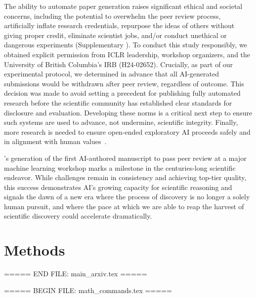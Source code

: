The ability to automate paper generation raises significant ethical and societal concerns, including the potential to overwhelm the peer review process, artificially inflate research credentials, repurpose the ideas of others without giving proper credit, eliminate scientist jobs, and/or conduct unethical or dangerous experiments (Supplementary ).
To conduct this study responsibly, we obtained explicit permission from ICLR leadership, workshop organizers, and the University of British Columbia's IRB (H24-02652).
Crucially, as part of our experimental protocol, we determined in advance that all AI-generated submissions would be withdrawn after peer review, regardless of outcome.
This decision was made to avoid setting a precedent for publishing fully automated research before the scientific community has established clear standards for disclosure and evaluation.
Developing these norms is a critical next step to ensure such systems are used to advance, not undermine, scientific integrity.
Finally, more research is needed to ensure open-ended exploratory AI proceeds safely and in alignment with human values~\citep{bommasani2021opportunities, ecoffet2020open}.

\ouralgo's generation of the first AI-authored manuscript to pass peer review at a major machine learning workshop marks a milestone in the centuries-long scientific endeavor.
While challenges remain in consistency and achieving top-tier quality, this success demonstrates AI's growing capacity for scientific reasoning and signals the dawn of a new era where the process of discovery is no longer a solely human pursuit, and where the pace at which we are able to reap the harvest of scientific discovery could accelerate dramatically.

\clearpage
\section*{Methods}
\label{sec:methods}



\clearpage
\hypersetup{pageanchor=false}

\hypersetup{pageanchor=true}

\clearpage




===== END FILE: main_arxiv.tex =====

===== BEGIN FILE: math_commands.tex =====


\usepackage{amsmath,amsfonts,bm}


